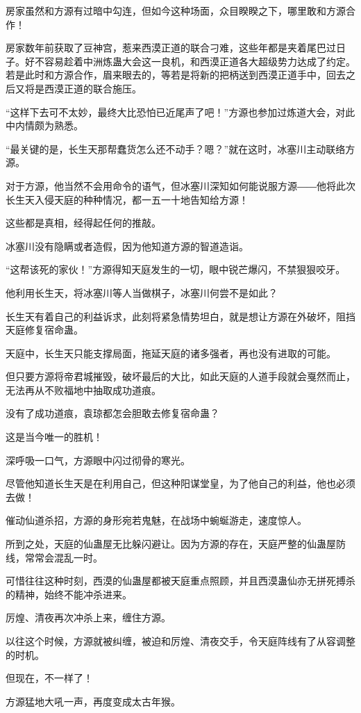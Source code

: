 \begin{this_body}
房家虽然和方源有过暗中勾连，但如今这种场面，众目睽睽之下，哪里敢和方源合作！

房家数年前获取了豆神宫，惹来西漠正道的联合刁难，这些年都是夹着尾巴过日子。好不容易趁着中洲炼蛊大会这一良机，和西漠正道各大超级势力达成了约定。若是此时和方源合作，眉来眼去的，等若是将新的把柄送到西漠正道手中，回去之后又将是西漠正道的联合施压。

“这样下去可不太妙，最终大比恐怕已近尾声了吧！”方源也参加过炼道大会，对此中内情颇为熟悉。

“最关键的是，长生天那帮蠢货怎么还不动手？嗯？”就在这时，冰塞川主动联络方源。

对于方源，他当然不会用命令的语气，但冰塞川深知如何能说服方源――他将此次长生天入侵天庭的种种情况，都一五一十地告知给方源！

这些都是真相，经得起任何的推敲。

冰塞川没有隐瞒或者造假，因为他知道方源的智道造诣。

“这帮该死的家伙！”方源得知天庭发生的一切，眼中锐芒爆闪，不禁狠狠咬牙。

他利用长生天，将冰塞川等人当做棋子，冰塞川何尝不是如此？

长生天有着自己的利益诉求，此刻将紧急情势坦白，就是想让方源在外破坏，阻挡天庭修复宿命蛊。

天庭中，长生天只能支撑局面，拖延天庭的诸多强者，再也没有进取的可能。

但只要方源将帝君城摧毁，破坏最后的大比，如此天庭的人道手段就会戛然而止，无法再从不败福地中抽取成功道痕。

没有了成功道痕，袁琼都怎会胆敢去修复宿命蛊？

这是当今唯一的胜机！

深呼吸一口气，方源眼中闪过彻骨的寒光。

尽管他知道长生天是在利用自己，但这种阳谋堂皇，为了他自己的利益，他也必须去做！

催动仙道杀招，方源的身形宛若鬼魅，在战场中蜿蜒游走，速度惊人。

所到之处，天庭的仙蛊屋无比躲闪避让。因为方源的存在，天庭严整的仙蛊屋防线，常常会混乱一时。

可惜往往这种时刻，西漠的仙蛊屋都被天庭重点照顾，并且西漠蛊仙亦无拼死搏杀的精神，始终不能冲杀进来。

厉煌、清夜再次冲杀上来，缠住方源。

以往这个时候，方源就被纠缠，被迫和厉煌、清夜交手，令天庭阵线有了从容调整的时机。

但现在，不一样了！

方源猛地大吼一声，再度变成太古年猴。


\end{this_body}
